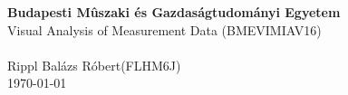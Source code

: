 \begin{titlepage}

\begin{center}
\vspace{0.3cm}
\textbf{Budapesti Mûszaki és Gazdaságtudományi Egyetem}\\
\textmd{Visual Analysis of Measurement Data (BMEVIMIAV16)}\\[5cm]

{\huge \bfseries \hwtitle}\\[0.8cm]
\vspace{5.5cm}
\Large Rippl Balázs Róbert(FLHM6J)\\

\vspace{1cm}
\textsc{\Large \today}\\

\end{center}
\end{titlepage}